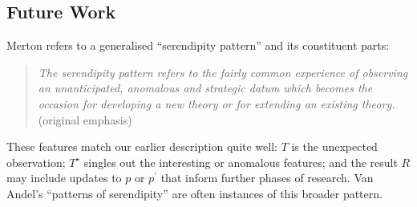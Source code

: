 \subsection{Future Work} \label{sec:futurework} \label{sec:hatching}

Merton \citeyear{merton1948bearing} \cite<cited in>[pp. 195--196]{merton} refers to a generalised ``serendipity pattern''
and its constituent parts:

\begin{quote}
\emph{The serendipity pattern refers to the fairly common experience of observing an \emph{unanticipated}, \emph{anomalous} \emph{and strategic} datum which becomes the occasion for developing a new theory or for extending an existing theory.}~\cite[p. 506]{merton1948bearing} (original emphasis)
\end{quote}

These features match our earlier description quite well: $T$ is the
unexpected observation; $T^\star$ singles out the interesting or
anomalous features; and the result $R$ may include updates to $p$ or
$p^{\prime}$ that inform further phases of research.
%
Van Andel's \citeyear{van1994anatomy} ``patterns of serendipity'' are
often instances of this broader pattern.



